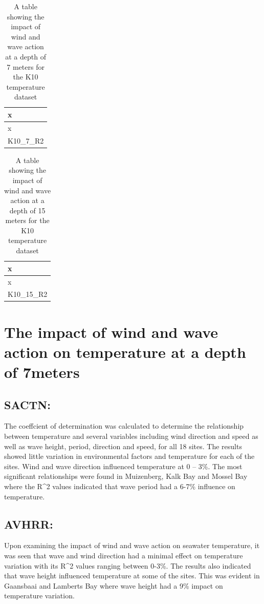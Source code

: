 \documentclass[12pt,]{article}
\begin{document}
\begin{longtable}[]{@{}l@{}}
\caption{A table showing the impact of wind and wave action at a depth
of 7 meters for the K10 temperature dataset}\tabularnewline
\toprule
x\tabularnewline
\midrule
\endfirsthead
\toprule
x\tabularnewline
\midrule
\endhead
K10\_7\_R2\tabularnewline
\bottomrule
\end{longtable}

\begin{longtable}[]{@{}l@{}}
\caption{A table showing the impact of wind and wave action at a depth
of 15 meters for the K10 temperature dataset}\tabularnewline
\toprule
x\tabularnewline
\midrule
\endfirsthead
\toprule
x\tabularnewline
\midrule
\endhead
K10\_15\_R2\tabularnewline
\bottomrule
\end{longtable}

\section{The impact of wind and wave action on temperature at a depth of
7meters}\label{the-impact-of-wind-and-wave-action-on-temperature-at-a-depth-of-7meters}

\subsection{SACTN:}\label{sactn}

The coeffcient of determination was calculated to determine the
relationship between temperature and several variables including wind
direction and speed as well as wave height, period, direction and speed,
for all 18 sites. The results showed little variation in environmental
factors and temperature for each of the sites. Wind and wave direction
influenced temperature at 0 -- 3\%. The most significant relationships
were found in Muizenberg, Kalk Bay and Mossel Bay where the R\^{}2
values indicated that wave period had a 6-7\% influence on temperature.

\subsection{AVHRR:}\label{avhrr}

Upon examining the impact of wind and wave action on seawater
temperature, it was seen that wave and wind direction had a minimal
effect on temperature variation with its R\^{}2 values ranging between
0-3\%. The results also indicated that wave height influenced
temperature at some of the sites. This was evident in Gaansbaai and
Lamberts Bay where wave height had a 9\% impact on temperature
variation.
\end{document}
